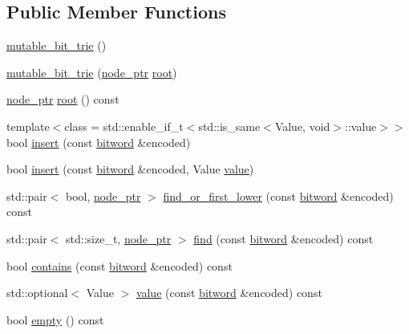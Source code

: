 \subsection*{Public Member Functions}
\begin{DoxyCompactItemize}
\item 
\mbox{\hyperlink{classirk_1_1mutable__bit__trie_a6927e834f866c053925d9ddf902774c1}{mutable\+\_\+bit\+\_\+trie}} ()
\item 
\mbox{\hyperlink{classirk_1_1mutable__bit__trie_a25fac71898d72afb04fc581ee5a913e7}{mutable\+\_\+bit\+\_\+trie}} (\mbox{\hyperlink{classirk_1_1mutable__bit__trie_abd23179ac4f02a981d4f47b4c0652287}{node\+\_\+ptr}} \mbox{\hyperlink{classirk_1_1mutable__bit__trie_a82b109eb8816a4ff9093ca5649d13db9}{root}})
\item 
\mbox{\hyperlink{classirk_1_1mutable__bit__trie_abd23179ac4f02a981d4f47b4c0652287}{node\+\_\+ptr}} \mbox{\hyperlink{classirk_1_1mutable__bit__trie_a82b109eb8816a4ff9093ca5649d13db9}{root}} () const
\item 
{\footnotesize template$<$class  = std\+::enable\+\_\+if\+\_\+t$<$std\+::is\+\_\+same$<$\+Value, void$>$\+::value$>$$>$ }\\bool \mbox{\hyperlink{classirk_1_1mutable__bit__trie_ab502e5df64f1e9fd767e2963f210334b}{insert}} (const \mbox{\hyperlink{namespaceirk_a979e09720c2ef05573819388a3c0e79a}{bitword}} \&encoded)
\item 
bool \mbox{\hyperlink{classirk_1_1mutable__bit__trie_a694f1825422ce94a786bc922baef651d}{insert}} (const \mbox{\hyperlink{namespaceirk_a979e09720c2ef05573819388a3c0e79a}{bitword}} \&encoded, Value \mbox{\hyperlink{classirk_1_1mutable__bit__trie_ad0bb2e18842b722d7deb1a5d4b72b890}{value}})
\item 
std\+::pair$<$ bool, \mbox{\hyperlink{classirk_1_1mutable__bit__trie_abd23179ac4f02a981d4f47b4c0652287}{node\+\_\+ptr}} $>$ \mbox{\hyperlink{classirk_1_1mutable__bit__trie_a30d25f61a4f6e7cb8d9ac6f0ff205f97}{find\+\_\+or\+\_\+first\+\_\+lower}} (const \mbox{\hyperlink{namespaceirk_a979e09720c2ef05573819388a3c0e79a}{bitword}} \&encoded) const
\item 
std\+::pair$<$ std\+::size\+\_\+t, \mbox{\hyperlink{classirk_1_1mutable__bit__trie_abd23179ac4f02a981d4f47b4c0652287}{node\+\_\+ptr}} $>$ \mbox{\hyperlink{classirk_1_1mutable__bit__trie_af0bd766c6c437fcdcb9612ba9de84510}{find}} (const \mbox{\hyperlink{namespaceirk_a979e09720c2ef05573819388a3c0e79a}{bitword}} \&encoded) const
\item 
bool \mbox{\hyperlink{classirk_1_1mutable__bit__trie_ab45e17c9d8b88f14654d52e27c092c30}{contains}} (const \mbox{\hyperlink{namespaceirk_a979e09720c2ef05573819388a3c0e79a}{bitword}} \&encoded) const
\item 
std\+::optional$<$ Value $>$ \mbox{\hyperlink{classirk_1_1mutable__bit__trie_ad0bb2e18842b722d7deb1a5d4b72b890}{value}} (const \mbox{\hyperlink{namespaceirk_a979e09720c2ef05573819388a3c0e79a}{bitword}} \&encoded) const
\item 
bool \mbox{\hyperlink{classirk_1_1mutable__bit__trie_abbfbe73cb98af4bb0375f00229cec50a}{empty}} () const
\end{DoxyCompactItemize}
